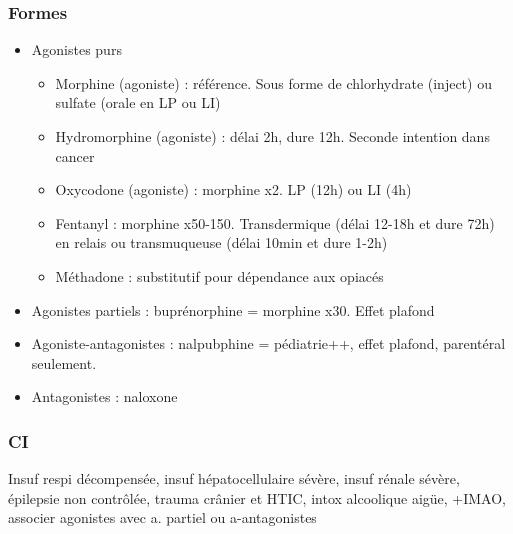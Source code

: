 \documentclass[11pt]{article}
\begin{document}
\subsubsection{Formes}
\label{sec:orgcf2bf29}
\begin{itemize}
\item Agonistes purs
\begin{itemize}
\item Morphine (agoniste) : référence. Sous forme de chlorhydrate (inject) ou
sulfate (orale en LP ou  LI)
\item Hydromorphine (agoniste) : délai 2h, dure 12h. Seconde intention dans cancer
\item Oxycodone (agoniste) : morphine x2. LP (12h) ou LI  (4h)
\item Fentanyl : morphine x50-150. Transdermique (délai 12-18h et dure 72h) en
relais ou transmuqueuse (délai 10min et dure 1-2h)
\item Méthadone : substitutif pour dépendance aux opiacés
\end{itemize}
\item Agonistes partiels : buprénorphine = morphine x30. Effet plafond
\item Agoniste-antagonistes : nalpubphine = pédiatrie++, effet plafond, parentéral
seulement.
\item Antagonistes : naloxone
\end{itemize}

\subsubsection{CI}
\label{sec:org4bec5fd}
Insuf respi décompensée, insuf hépatocellulaire sévère, insuf rénale sévère,
épilepsie non contrôlée, trauma crânier et HTIC, intox alcoolique aigüe, +IMAO,
associer agonistes avec a. partiel ou a-antagonistes
\end{document}

